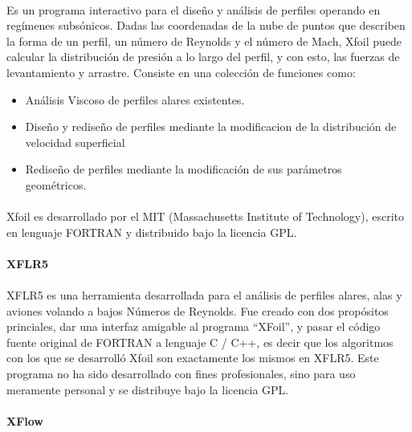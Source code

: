 \documentclass[letterpaper, openright, 12pt]{book}
\begin{document}
    \paragraph*{}
    Es un programa interactivo para el diseño y análisis de perfiles operando
    en regímenes subsónicos. Dadas las coordenadas de la nube de puntos que
    describen la forma de un perfil, un número de Reynolds y el número de Mach,
    Xfoil puede calcular la distribución de presión a lo largo del perfil, y
    con esto, las fuerzas de levantamiento y arrastre. Consiste en una
    colección de funciones como:
    \begin{itemize}
        \item Análisis Viscoso de perfiles alares existentes.
        \item Diseño y rediseño de perfiles mediante la
            modificacion de la distribución de velocidad
            superficial
        \item Rediseño de perfiles mediante la modificación de
            sus parámetros geométricos.~\cite{xfoil}
    \end{itemize}

    \paragraph*{}
    Xfoil es desarrollado por el MIT (Massachusetts Institute of
    Technology), escrito en lenguaje FORTRAN y distribuido bajo
    la licencia GPL.

    \paragraph*{XFLR5}
    \paragraph*{}
    XFLR5 es una herramienta desarrollada para el análisis de perfiles alares,
    alas y aviones volando a bajos Números de Reynolds. Fue creado con dos
    propósitos princiales, dar una interfaz amigable al programa ``XFoil'', y
    pasar el código fuente original de FORTRAN a lenguaje C / C++, es decir que
    los algoritmos con los que se desarrolló Xfoil son exactamente los mismos
    en XFLR5.\cite{xflr5} Este programa no ha sido desarrollado con fines
    profesionales, sino para uso meramente personal y se distribuye bajo la
    licencia GPL\@.

    \paragraph*{XFlow}
\end{document}
